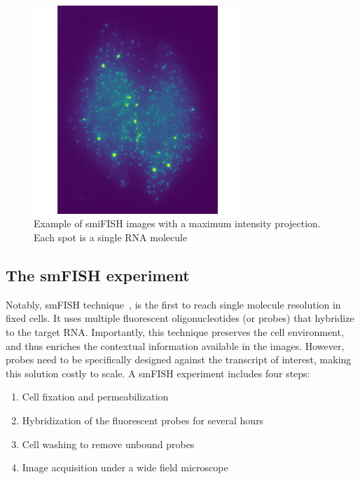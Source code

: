 \begin{figure}[]
    \centering
    \includegraphics[width=0.7\textwidth]{figures/introduction/multichannel_input}
	\caption[Example of smiFISH image]{Example of smiFISH images with a maximum intensity projection.
	Each spot is a single RNA molecule}
    \label{fig:smFISH_input}
\end{figure}

\subsection{The smFISH experiment}
\label{subsec:intro_smfish}

Notably, \ac{smFISH} technique~\cite{Femino_1998}, is the first to reach single molecule resolution in fixed cells.
It uses multiple fluorescent oligonucleotides (or probes) that hybridize to the target RNA. 
Importantly, this technique preserves the cell environment, and thus enriches the contextual information available in the images.
However, probes need to be specifically designed against the transcript of interest, making this solution costly to scale.
A \ac{smFISH} experiment includes four steps:

\begin{enumerate}
	\setlength\itemsep{0.1em}
	\item Cell fixation and permeabilization
	\item Hybridization of the fluorescent probes for several hours
	\item Cell washing to remove unbound probes
	\item Image acquisition under a wide field microscope
\end{enumerate}

